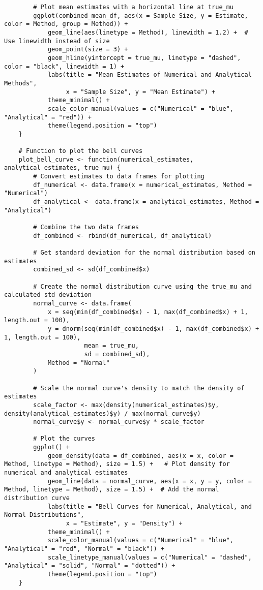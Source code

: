 \documentclass{report}
\begin{document}
\begin{verbatim}
        # Plot mean estimates with a horizontal line at true_mu
        ggplot(combined_mean_df, aes(x = Sample_Size, y = Estimate, color = Method, group = Method)) +
            geom_line(aes(linetype = Method), linewidth = 1.2) +  # Use linewidth instead of size
            geom_point(size = 3) +
            geom_hline(yintercept = true_mu, linetype = "dashed", color = "black", linewidth = 1) +
            labs(title = "Mean Estimates of Numerical and Analytical Methods",
                 x = "Sample Size", y = "Mean Estimate") +
            theme_minimal() +
            scale_color_manual(values = c("Numerical" = "blue", "Analytical" = "red")) +
            theme(legend.position = "top")
    }
    
    # Function to plot the bell curves
    plot_bell_curve <- function(numerical_estimates, analytical_estimates, true_mu) {
        # Convert estimates to data frames for plotting
        df_numerical <- data.frame(x = numerical_estimates, Method = "Numerical")
        df_analytical <- data.frame(x = analytical_estimates, Method = "Analytical")
        
        # Combine the two data frames
        df_combined <- rbind(df_numerical, df_analytical)
        
        # Get standard deviation for the normal distribution based on estimates
        combined_sd <- sd(df_combined$x)
    
        # Create the normal distribution curve using the true_mu and calculated std deviation
        normal_curve <- data.frame(
            x = seq(min(df_combined$x) - 1, max(df_combined$x) + 1, length.out = 100),
            y = dnorm(seq(min(df_combined$x) - 1, max(df_combined$x) + 1, length.out = 100),
                      mean = true_mu,
                      sd = combined_sd),
            Method = "Normal"
        )
        
        # Scale the normal curve's density to match the density of estimates
        scale_factor <- max(density(numerical_estimates)$y, density(analytical_estimates)$y) / max(normal_curve$y)
        normal_curve$y <- normal_curve$y * scale_factor
    
        # Plot the curves
        ggplot() +
            geom_density(data = df_combined, aes(x = x, color = Method, linetype = Method), size = 1.5) +   # Plot density for numerical and analytical estimates
            geom_line(data = normal_curve, aes(x = x, y = y, color = Method, linetype = Method), size = 1.5) +  # Add the normal distribution curve
            labs(title = "Bell Curves for Numerical, Analytical, and Normal Distributions",
                 x = "Estimate", y = "Density") +
            theme_minimal() +
            scale_color_manual(values = c("Numerical" = "blue", "Analytical" = "red", "Normal" = "black")) +
            scale_linetype_manual(values = c("Numerical" = "dashed", "Analytical" = "solid", "Normal" = "dotted")) +
            theme(legend.position = "top")
    }
    

\end{verbatim}
\end{document}
